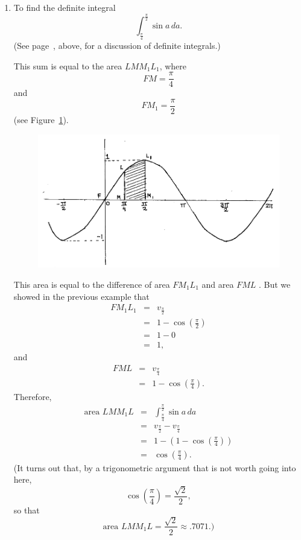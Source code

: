 \documentclass[twoside,openright]{article}
\newlength{\oldjot}
\begin{document}
\begin{enumerate}
\item To find the definite integral 
$$\int_\frac{\pi}{4}^\frac{\pi}{2}\!\sin a\,da.$$
(See page~\pageref{defint}, above, for a discussion of definite integrals.)

 This sum is equal to the area $LMM_1L_1$, where 
$$FM = \frac{\pi}{4}$$
 and 
 $$FM_1 = \frac{\pi}{2}$$
 (see Figure~\ref{defsinsum}).
 \begin{figure}[htp]
\begin{center}
\includegraphics[width=\textwidth]{fig/Figure50}
\caption{}
\label{defsinsum}
\vspace{-10pt}
\end{center}
\end{figure}  This area is equal to the difference of area $FM_1L_1$ and area $FML$ .  But we showed in the previous example that 
\begin{eqnarray*}
FM_1L_1 & = & v_\frac{\pi}{2}\\
 & = & 1 - \cos\left(\frac{\pi}{2}\right)\\ 
 & = & 1 - 0\\
 & = & 1,
 \end{eqnarray*}
 and
 \begin{eqnarray*}
FML & = & v_\frac{\pi}{4}\\
 & = & 1 - \cos\left(\frac{\pi}{4}\right).
  \end{eqnarray*}
 Therefore,
\begin{eqnarray*}
\mbox{area }LMM_1L & = & \int_\frac{\pi}{4}^\frac{\pi}{2}\!\sin a\,da \\
& = & v_\frac{\pi}{2} - v_\frac{\pi}{4}\\
& = & 1 - \left(1 - \cos\left(\frac{\pi}{4}\right)\right)\\
& = & \cos\left(\frac{\pi}{4}\right).
\end{eqnarray*}
\setlength{\jot}{\oldjot}
\hspace{-.4em}(It turns out that, by a trigonometric argument that is not worth going into here,
 $$\cos\left(\frac{\pi}{4}\right) = \frac{\sqrt{2}}{2},$$
 so that 
 $$\mbox{area }LMM_1L = \frac{\sqrt{2}}{2} \approx  .7071.)$$

\end{enumerate}
\end{document}
